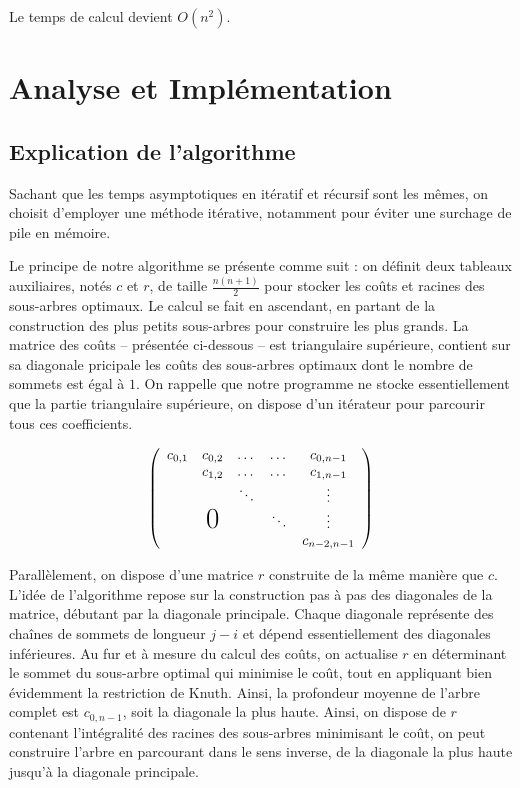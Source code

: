 \documentclass[12pt,a4paper]{article}
\begin{document}
	Le temps de calcul devient $O(n^2)$.
	
	\section{Analyse et Implémentation}
	\subsection{Explication de l'algorithme}
	Sachant que les temps asymptotiques en itératif et récursif sont les mêmes, on choisit d'employer une méthode itérative, notamment pour éviter une surchage de pile en mémoire. \par\leavevmode\par

	Le principe de notre algorithme se présente comme suit : on définit deux tableaux auxiliaires, notés $c$ et $r$, de taille $\frac{n(n+1)}{2}$ pour stocker les coûts et racines des sous-arbres optimaux. Le calcul se fait en ascendant, en partant de la construction des plus petits sous-arbres pour construire les plus grands. La matrice des coûts -- présentée ci-dessous -- est triangulaire supérieure, contient sur sa diagonale pricipale les coûts des sous-arbres optimaux dont le nombre de sommets est égal à $1$. On rappelle que notre programme ne stocke essentiellement que la partie triangulaire supérieure, on dispose d'un itérateur pour parcourir tous ces coefficients. \par\leavevmode\par
	\[
		\left(
		\begin{array}{ccccc}
		  c_{0,1} & c_{0,2} & \dots & \dots & c_{0,n-1} \\
		  &       c_{1,2}       &\dots & \dots  & c_{1,n-1} \\
		  &               & \ddots     &   & \vdots           \\
		  & \text{\huge0} &    &  \ddots   & \vdots       \\
		  &               &   &   & c_{n-2,n-1}
		\end{array}
		\right)
	\]  
	\par\leavevmode\par
	Parallèlement, on dispose d'une matrice $r$ construite de la même manière que $c$. L'idée de l'algorithme repose sur la construction pas à pas des diagonales de la matrice, débutant par la diagonale principale. Chaque diagonale représente des chaînes de sommets de longueur $j - i$ et dépend essentiellement des diagonales inférieures. Au fur et à mesure du calcul des coûts, on actualise $r$ en déterminant le sommet du sous-arbre optimal qui minimise le coût, tout en appliquant bien évidemment la restriction de Knuth. Ainsi, la profondeur moyenne de l'arbre complet est $c_{0,n-1}$, soit la diagonale la plus haute.
	Ainsi, on dispose de $r$ contenant l'intégralité des racines des sous-arbres minimisant le coût, on peut construire l'arbre en parcourant dans le sens inverse, de la diagonale la plus haute jusqu'à la diagonale principale.
\end{document}
